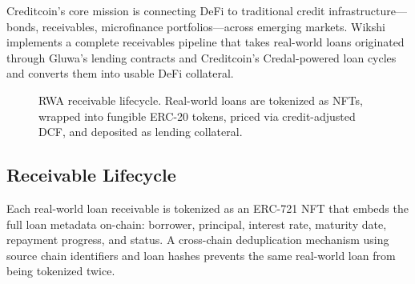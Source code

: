 \documentclass[11pt,a4paper]{article}
\begin{document}
Creditcoin's core mission is connecting DeFi to traditional credit infrastructure---bonds, receivables, microfinance portfolios---across emerging markets. Wikshi implements a complete receivables pipeline that takes real-world loans originated through Gluwa's lending contracts and Creditcoin's Credal-powered loan cycles and converts them into usable DeFi collateral.

\begin{figure}[H]
\centering
{}
\caption{RWA receivable lifecycle. Real-world loans are tokenized as NFTs, wrapped into fungible ERC-20 tokens, priced via credit-adjusted DCF, and deposited as lending collateral.}
\label{fig:rwa-pipeline}
\end{figure}

\subsection{Receivable Lifecycle}

Each real-world loan receivable is tokenized as an ERC-721 NFT that embeds the full loan metadata on-chain: borrower, principal, interest rate, maturity date, repayment progress, and status. A cross-chain deduplication mechanism using source chain identifiers and loan hashes prevents the same real-world loan from being tokenized twice.
\end{document}
